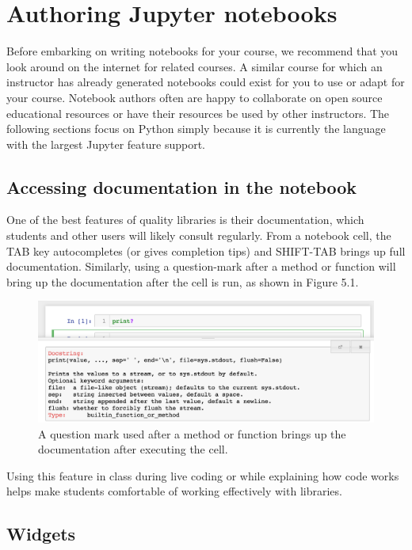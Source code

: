 \documentclass[]{book}
\begin{document}
\section{Authoring Jupyter notebooks}\label{authoring-jupyter-notebooks}

Before embarking on writing notebooks for your course, we recommend that
you look around on the internet for related courses. A similar course
for which an instructor has already generated notebooks could exist for
you to use or adapt for your course. Notebook authors often are happy to
collaborate on open source educational resources or have their resources
be used by other instructors. The following sections focus on Python
simply because it is currently the language with the largest Jupyter
feature support.

\subsection{Accessing documentation in the
notebook}\label{accessing-documentation-in-the-notebook}

One of the best features of quality libraries is their documentation,
which students and other users will likely consult regularly. From a
notebook cell, the TAB key autocompletes (or gives completion tips) and
SHIFT-TAB brings up full documentation. Similarly, using a question-mark
after a method or function will bring up the documentation after the
cell is run, as shown in Figure 5.1.

\begin{figure}
\centering
\includegraphics{images/chapter50.png}
\caption{A question mark used after a method or function brings up the
documentation after executing the cell.}
\end{figure}

Using this feature in class during live coding or while explaining how
code works helps make students comfortable of working effectively with
libraries.

\subsection{Widgets}\label{widgets}
\end{document}
